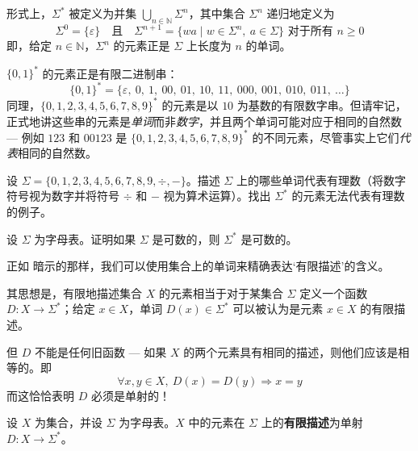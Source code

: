 形式上，$\Sigma^*$ 被定义为并集 $\displaystyle\bigcup_{n \in \mathbb{N}} \Sigma^n$，其中集合 $\Sigma^n$ 递归地定义为
\[ \Sigma^0 = \{ \varepsilon \} \quad \text{且} \quad \Sigma^{n+1} = \{ wa \mid w \in \Sigma^n,~ a \in \Sigma \} \text{ 对于所有 } n \ge 0 \]
即，给定 $n \in \mathbb{N}$，$\Sigma^n$ 的元素正是 $\Sigma$ 上长度为 $n$ 的单词。

\begin{example}
\label{exSomeExamplesOfFiniteStrings}
$\{ 0,1 \}^*$ 的元素正是有限二进制串：
\[ \{ 0,1 \}^* = \{ \varepsilon,~ 0,~ 1,~ 00,~ 01,~ 10,~ 11,~ 000,~ 001,~ 010,~ 011,~ \dots \} \]
同理，$\{ 0,1,2,3,4,5,6,7,8,9 \}^*$ 的元素是以 $10$ 为基数的有限数字串。但请牢记，正式地讲这些串的元素是\textit{单词}而非\textit{数字}，并且两个单词可能对应于相同的自然数 --- 例如 $123$ 和 $00123$ 是 $\{ 0,1,2,3,4,5,6,7,8,9 \}^*$ 的不同元素，尽管事实上它们\textit{代表}相同的自然数。
\end{example}

\begin{exercise}
设 $\Sigma = \{ 0,1,2,3,4,5,6,7,8,9,{\div},{-} \}$。描述 $\Sigma$ 上的哪些单词代表有理数（将数字符号视为数字并将符号 $\div$ 和 $-$ 视为算术运算）。找出 $\Sigma^*$ 的元素无法代表有理数的例子。
\end{exercise}

\begin{exercise}
设 $\Sigma$ 为字母表。证明如果 $\Sigma$ 是可数的，则 $\Sigma^*$ 是可数的。
\end{exercise}

正如  暗示的那样，我们可以使用集合上的单词来精确表达`有限描述'的含义。

其思想是，有限地描述集合 $X$ 的元素相当于对于某集合 $\Sigma$ 定义一个函数 $D : X \to \Sigma^*$；给定 $x \in X$，单词 $D(x) \in \Sigma^*$ 可以被认为是元素 $x \in X$ 的有限描述。 

但 $D$ 不能是任何旧函数 --- 如果 $X$ 的两个元素具有相同的描述，则他们应该是相等的。即
\[ \forall x,y \in X,~ D(x) = D(y) \Rightarrow x=y \]
而这恰恰表明 $D$ 必须是单射的！

\begin{definition}
\label{defFiniteDescription}
设 $X$ 为集合，并设 $\Sigma$ 为字母表。$X$ 中的元素在 $\Sigma$ 上的\textbf{有限描述}为单射 $D : X \to \Sigma^*$。
\end{definition}

